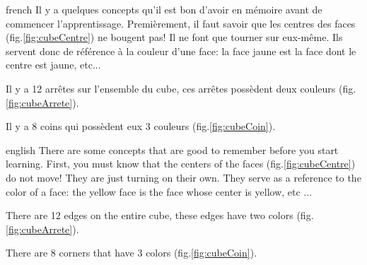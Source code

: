 \documentclass[0_Main.tex]{subfiles}
\begin{document}
\clearpage
{}
\begin{shownto}{french}
Il y a quelques concepts qu’il est bon d’avoir en mémoire avant de commencer l’apprentissage. Premièrement, il faut savoir que les centres des faces (fig.\ref{fig:cubeCentre}) ne bougent pas! Il ne font que tourner sur eux-même. Ils servent donc de référence à la couleur d’une face: la face jaune est la face dont le centre est jaune, etc... 

Il y a 12 arrêtes sur l’ensemble du cube, ces arrêtes possèdent deux couleurs (fig.\ref{fig:cubeArrete}).

Il y a 8 coins qui possèdent eux 3 couleurs (fig.\ref{fig:cubeCoin}).
\end{shownto}

\begin{shownto}{english}
There are some concepts that are good to remember before you start learning. First, you must know that the centers of the faces (fig.\ref{fig:cubeCentre}) do not move! They are just turning on their own. They serve as a reference to the color of a face: the yellow face is the face whose center is yellow, etc ...

There are 12 edges on the entire cube, these edges have two colors (fig.\ref{fig:cubeArrete}).

There are 8 corners that have 3 colors (fig.\ref{fig:cubeCoin}).
\end{shownto}
\end{document}
